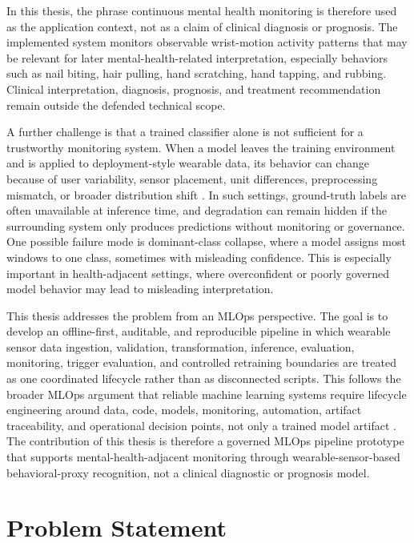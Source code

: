 In this thesis, the phrase continuous mental health monitoring is therefore used as the application context, not as a claim of clinical diagnosis or prognosis. The implemented system monitors observable wrist-motion activity patterns that may be relevant for later mental-health-related interpretation, especially behaviors such as nail biting, hair pulling, hand scratching, hand tapping, and rubbing. Clinical interpretation, diagnosis, prognosis, and treatment recommendation remain outside the defended technical scope.

A further challenge is that a trained classifier alone is not sufficient for a trustworthy monitoring system. When a model leaves the training environment and is applied to deployment-style wearable data, its behavior can change because of user variability, sensor placement, unit differences, preprocessing mismatch, or broader distribution shift \cite{akbari2020personalizing,wang2024enhancing,dhekane2024transfer,jackson2019agile}. In such settings, ground-truth labels are often unavailable at inference time, and degradation can remain hidden if the surrounding system only produces predictions without monitoring or governance. One possible failure mode is dominant-class collapse, where a model assigns most windows to one class, sometimes with misleading confidence. This is especially important in health-adjacent settings, where overconfident or poorly governed model behavior may lead to misleading interpretation.

This thesis addresses the problem from an MLOps perspective. The goal is to develop an offline-first, auditable, and reproducible pipeline in which wearable sensor data ingestion, validation, transformation, inference, evaluation, monitoring, trigger evaluation, and controlled retraining boundaries are treated as one coordinated lifecycle rather than as disconnected scripts. This follows the broader MLOps argument that reliable machine learning systems require lifecycle engineering around data, code, models, monitoring, automation, artifact traceability, and operational decision points, not only a trained model artifact \cite{amershi2019mlops,kreuzberger2023mlops,paleyes2022challenges,gift2021practicalmlops}. The contribution of this thesis is therefore a governed MLOps pipeline prototype that supports mental-health-adjacent monitoring through wearable-sensor-based behavioral-proxy recognition, not a clinical diagnostic or prognosis model.


\section{Problem Statement}

